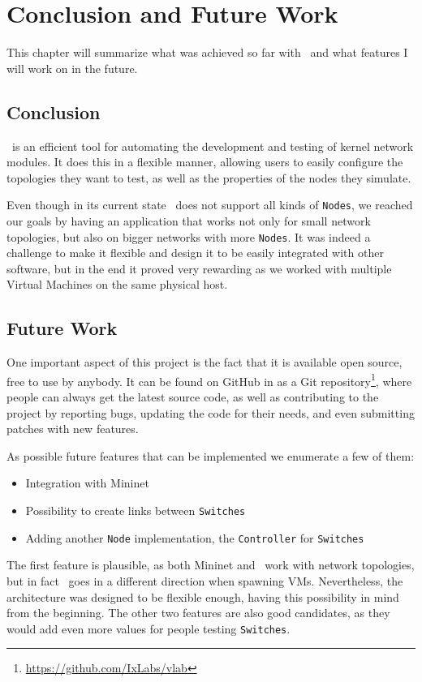 \chapter{Conclusion and Future Work}
\label{chapter:Chapter 6}

This chapter will summarize what was achieved so far with \project\ and what features I will work on in the future.

\section{Conclusion}
\label{sec:conclusion}

\project\ is an efficient tool for automating the development and testing of kernel network modules.
It does this in a flexible manner, allowing users to easily configure the topologies they want to test, as well as the properties of the nodes they simulate.

Even though in its current state \project\ does not support all kinds of \texttt{Nodes}, we reached our goals by having an application that works not only for small network topologies, but also on bigger networks with more \texttt{Nodes}.
It was indeed a challenge to make it flexible and design it to be easily integrated with other software, but in the end it proved very rewarding as we worked with multiple Virtual Machines on the same physical host.

\section{Future Work}
\label{sec:future-work}

One important aspect of this project is the fact that it is available open source, free to use by anybody.
It can be found on GitHub in as a Git repository\footnote{\url{https://github.com/IxLabs/vlab}}, where people can always get the latest source code, as well as contributing to the project by reporting bugs, updating the code for their needs, and even submitting patches with new features.

As possible future features that can be implemented we enumerate a few of them:
\begin{itemize}
  \item Integration with Mininet
  \item Possibility to create links between \texttt{Switches}
  \item Adding another \texttt{Node} implementation, the \texttt{Controller} for \texttt{Switches}
\end{itemize}

The first feature is plausible, as both Mininet and \project\ work with network topologies, but in fact \project\ goes in a different direction when spawning VMs.
Nevertheless, the architecture was designed to be flexible enough, having this possibility in mind from the beginning.
The other two features are also good candidates, as they would add even more values for people testing \texttt{Switches}.
